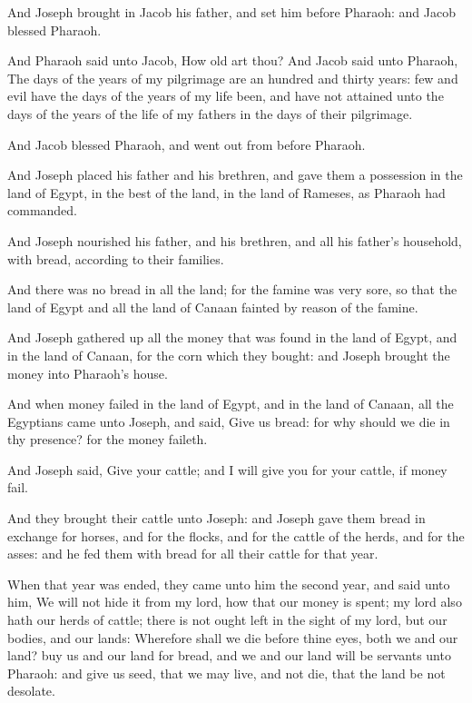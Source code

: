 \verse And Joseph brought in Jacob his father, and set him before
Pharaoh: and Jacob blessed Pharaoh.

\verse And Pharaoh said unto Jacob, How old art thou?  \verse And Jacob
said unto Pharaoh, The days of the years of my pilgrimage are an
hundred and thirty years: few and evil have the days of the years of
my life been, and have not attained unto the days of the years of the
life of my fathers in the days of their pilgrimage.

\verse And Jacob blessed Pharaoh, and went out from before Pharaoh.

\verse And Joseph placed his father and his brethren, and gave them a
possession in the land of Egypt, in the best of the land, in the land
of Rameses, as Pharaoh had commanded.

\verse And Joseph nourished his father, and his brethren, and all his
father's household, with bread, according to their families.

\verse And there was no bread in all the land; for the famine was very
sore, so that the land of Egypt and all the land of Canaan fainted by
reason of the famine.

\verse And Joseph gathered up all the money that was found in the land
of Egypt, and in the land of Canaan, for the corn which they bought:
and Joseph brought the money into Pharaoh's house.

\verse And when money failed in the land of Egypt, and in the land of
Canaan, all the Egyptians came unto Joseph, and said, Give us bread:
for why should we die in thy presence? for the money faileth.

\verse And Joseph said, Give your cattle; and I will give you for your
cattle, if money fail.

\verse And they brought their cattle unto Joseph: and Joseph gave them
bread in exchange for horses, and for the flocks, and for the cattle
of the herds, and for the asses: and he fed them with bread for all
their cattle for that year.

\verse When that year was ended, they came unto him the second year,
and said unto him, We will not hide it from my lord, how that our
money is spent; my lord also hath our herds of cattle; there is not
ought left in the sight of my lord, but our bodies, and our lands:
\verse Wherefore shall we die before thine eyes, both we and our land?
buy us and our land for bread, and we and our land will be servants
unto Pharaoh: and give us seed, that we may live, and not die, that
the land be not desolate.


